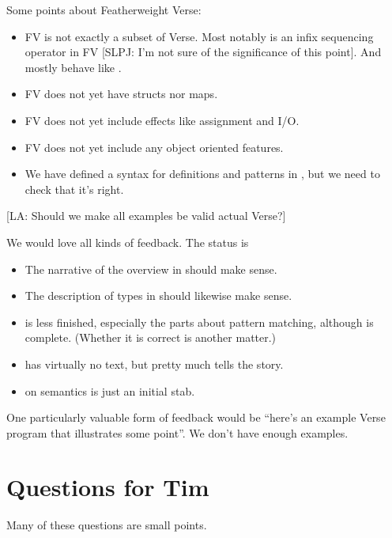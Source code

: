 \documentclass[acmsmall,review,anonymous,dvipsnames]{acmart}\settopmatter{printfolios=true,printccs=false,printacmref=false}
\newcommand{\simon}[1]{{\color{dkblue} [{SLPJ}: #1]}}
\newcommand{\lennart}[1]{{\color{dkcyan} [{LA}: #1]}}
\newcommand{\simon}[1]{}
\newcommand{\lennart}[1]{}
\newcommand{\vtt}[1]{\text{\tt #1}}
\begin{document}
Some points about Featherweight Verse:
\begin{itemize}
\item FV is not exactly a subset of Verse.  Most notably \vtt{;} is an infix
  sequencing operator in FV \simon{I'm not sure of the significance of this point}.
  And \vtt{\{\}} mostly behave like \vtt{()}.
\item FV does not yet have structs nor maps.
\item FV does not yet include effects like assignment and I/O.
\item FV does not yet include any object oriented features.
\item We have defined a syntax for definitions and patterns in , but we need to check that it's right.
\end{itemize}
\lennart{Should we make all examples be valid actual Verse?}

We would love all kinds of feedback. The status is
\begin{itemize}
  \item The narrative of the overview in  should make sense.
  \item The description of types in  should likewise make sense.
  \item {} is less finished, especially the parts about pattern matching, although 
    is complete.  (Whether it is correct is another matter.)
  \item {} has virtually no text, but  pretty much tells the story.
    \item {} on semantics is just an initial stab.
\end{itemize}
One particularly valuable form of feedback would be ``here's an example Verse program that illustrates some point''.
We don't have enough examples.

\section{Questions for Tim}

Many of these questions are small points.
\end{document}
